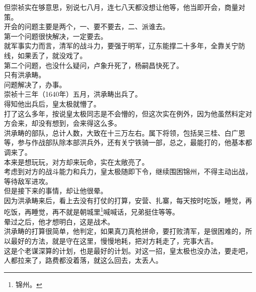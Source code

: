 \begin{multicols}{\theparacolNo}
但崇祯实在够意思，别说七八月，连七八天都没想让他等，他当即开会，商量对策。\\

开会的问题主要是两个，一、要不要去，二、派谁去。\\

第一个问题很快解决，一定要去。\\

就军事实力而言，清军的战斗力，要强于明军，辽东能撑二十多年，全靠关宁防线，如果丢了，就没戏了。\\

第二个问题，也没什么疑问，卢象升死了，杨嗣昌快死了。\\

只有洪承畴。\\

问题解决了，办事。\\

崇祯十三年（1640年）五月，洪承畴出兵了。\\

得知他出兵后，皇太极就懵了。\\

打了这么多年，按说皇太极同志是不会懵的，但这次实在例外，因为他虽然料定对方会来，却没有想到，会来得这么多。\\

洪承畴的部队，总计人数，大致在十三万左右。属下将领，包括吴三桂、白广恩等，参与作战部队除本部洪兵外，还有关宁铁骑一部，总之，最能打的，他基本都调来了。\\

本来是想玩玩，对方却来玩命，实在太敞亮了。\\

考虑到对方的战斗能力和兵力，皇太极随即下令，继续围困锦州，不得主动出战，等待敌军进攻。\\

但是接下来的事情，却让他很晕。\\

因为洪承畴来后，看上去没有打仗的打算，安营、扎寨，每天按时吃饭，睡觉，再吃饭，再睡觉，再不就是朝城里\footnote{锦州。}喊喊话，兄弟挺住等等。\\

晕过之后，他才想明白，这是战术。\\

洪承畴的打算很简单，他判定，如果真刀真枪拼命，要打败清军，是很困难的，所以最好的方法，就是守在这里，慢慢地耗，把对方耗走了，完事大吉。\\

这是个老谋深算的计划，也是最好的计划。对这一招，皇太极也没办法，要走吧，人都拉来了，路费都没着落，就这么回去，太丢人。\\


\end{multicols}
